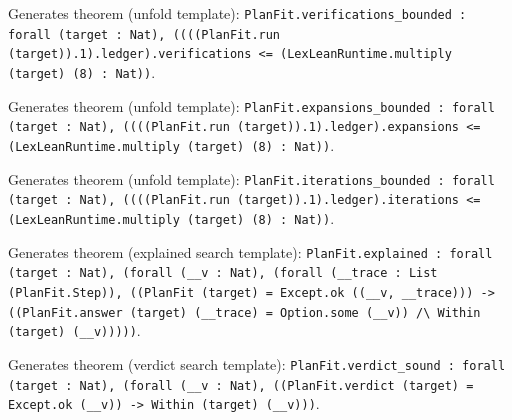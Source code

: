 \documentclass[11pt]{article}
\begin{document}
\noindent Generates theorem (unfold template): \texttt{PlanFit.verifications\_bounded : forall (target : Nat), ((((PlanFit.run (target)).1).ledger).verifications <= (LexLeanRuntime.multiply (target) (8) : Nat))}.\par
\noindent Generates theorem (unfold template): \texttt{PlanFit.expansions\_bounded : forall (target : Nat), ((((PlanFit.run (target)).1).ledger).expansions <= (LexLeanRuntime.multiply (target) (8) : Nat))}.\par
\noindent Generates theorem (unfold template): \texttt{PlanFit.iterations\_bounded : forall (target : Nat), ((((PlanFit.run (target)).1).ledger).iterations <= (LexLeanRuntime.multiply (target) (8) : Nat))}.\par
\noindent Generates theorem (explained search template): \texttt{PlanFit.explained : forall (target : Nat), (forall (\_\_v : Nat), (forall (\_\_trace : List (PlanFit.Step)), ((PlanFit (target) = Except.ok ((\_\_v, \_\_trace))) -> ((PlanFit.answer (target) (\_\_trace) = Option.some (\_\_v)) /\textbackslash{} Within (target) (\_\_v)))))}.\par
\noindent Generates theorem (verdict search template): \texttt{PlanFit.verdict\_sound : forall (target : Nat), (forall (\_\_v : Nat), ((PlanFit.verdict (target) = Except.ok (\_\_v)) -> Within (target) (\_\_v)))}.\par
\end{document}
